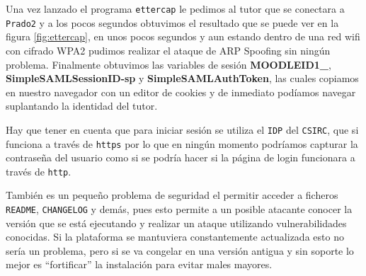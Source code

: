 \bigskip
Una vez lanzado el programa \texttt{ettercap} le pedimos al tutor que se conectara a \texttt{Prado2} y a los pocos segundos obtuvimos el resultado que se puede ver en la figura \ref{fig:ettercap}, en unos pocos segundos y aun estando dentro de una red wifi con cifrado WPA2 pudimos realizar el ataque de ARP Spoofing sin ningún problema. Finalmente obtuvimos las variables de sesión \textbf{MOODLEID1\_}, \textbf{SimpleSAMLSessionID-sp} y \textbf{SimpleSAMLAuthToken}, las cuales copiamos en nuestro navegador con un editor de cookies y de inmediato podíamos navegar suplantando la identidad del tutor.

\bigskip
Hay que tener en cuenta que para iniciar sesión se utiliza el \texttt{IDP} del \texttt{CSIRC}, que si funciona a través de \texttt{https} por lo que en ningún momento podríamos capturar la contraseña del usuario como si se podría hacer si la página de login funcionara a través de \texttt{http}.

\bigskip
También es un pequeño problema de seguridad el permitir acceder a ficheros \texttt{README}, \texttt{CHANGELOG} y demás, pues esto permite a un posible atacante conocer la versión que se está ejecutando y realizar un ataque utilizando vulnerabilidades conocidas. Si la plataforma se mantuviera constantemente actualizada esto no sería un problema, pero si se va congelar en una versión antigua y sin soporte lo mejor es ``fortificar'' la instalación para evitar males mayores.

